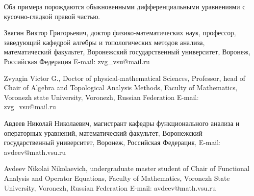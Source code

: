 \documentclass[a4paper]{article} %
\begin{document}
Оба примера порождаются обыкновенными дифференциальными уравнениями с кусочно-гладкой правой частью.





Звягин Виктор Григорьевич, доктор
физико-математических наук, профессор,
заведующий кафедрой алгебры и топологических методов
анализа, математический факультет, Воронежский государственный университет,
Воронеж, Российская Федерация
E-mail: zvg\_vsu@mail.ru

Zvyagin Victor G., Doctor of physical-mathematical Sciences, Professor, head
of Chair of Algebra and
Topological Analysis Methods,
Faculty of Mathematics,
Voronezh state University, Voronezh, Russian
Federation
E-mail: zvg\_vsu@mail.ru


Авдеев Николай Николаевич,
магистрант кафедры функционального анализа и операторных уравнений,
математический факультет, Воронежский государственный университет,
Воронеж, Российская Федерация,
E-mail: avdeev@math.vsu.ru

Avdeev Nikolai Nikolaevich, undergraduate master student
of Chair of Functional Analysis and Operator Equations,
Faculty of Mathematics, Voronezh State
University, Voronezh, Russian Federation
E-mail: avdeev@math.vsu.ru
\end{document}
